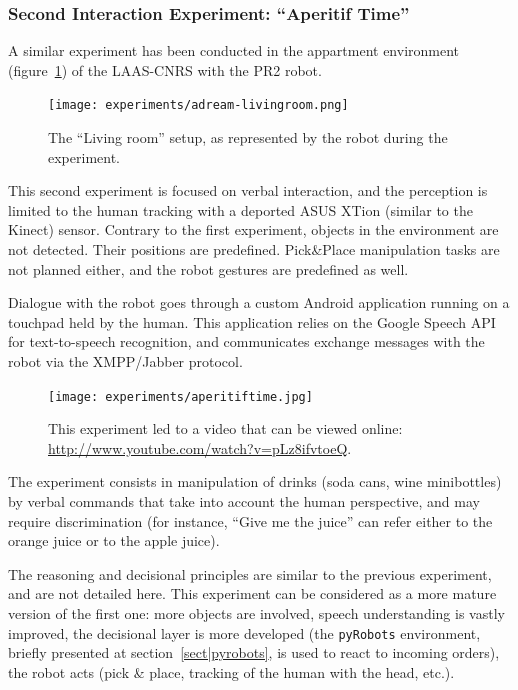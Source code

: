 \subsubsection{Second Interaction Experiment: ``Aperitif Time''}
\label{sect|expe2}

A similar experiment has been conducted in the appartment environment
(figure~\ref{fig|livingroom}) of the LAAS-CNRS with the PR2 robot.

\begin{figure}
    \centering
    \texttt{[image: experiments/adream-livingroom.png]}

    \caption{The ``Living room'' setup, as represented by the robot during the
    experiment.}

    \label{fig|livingroom}
\end{figure}

This second experiment is focused on verbal interaction, and the perception is
limited to the human tracking with a deported ASUS XTion (similar to the
Kinect) sensor. Contrary to the first experiment, objects in the environment
are not detected. Their positions are predefined. Pick\&Place manipulation
tasks are not planned either, and the robot gestures are predefined as well.

Dialogue with the robot goes through a custom Android application running on a
touchpad held by the human. This application relies on the Google Speech API
for text-to-speech recognition, and communicates exchange messages with the
robot via the XMPP/Jabber protocol.


\begin{figure}
    \centering
    \texttt{[image: experiments/aperitiftime.jpg]}
    \caption{This experiment led to a video that can be viewed online:
\url{http://www.youtube.com/watch?v=pLz8ifvtoeQ}.}
    \label{fig|aperitif-video}
\end{figure}

The experiment consists in manipulation of drinks (soda cans, wine minibottles)
by verbal commands that take into account the human perspective, and may
require discrimination (for instance, ``Give me the juice'' can refer either to
the orange juice or to the apple juice).

The reasoning and decisional principles are similar to the previous experiment,
and are not detailed here. This experiment can be considered as a more mature
version of the first one: more objects are involved, speech understanding is
vastly improved, the decisional layer is more developed (the {\tt pyRobots}
environment, briefly presented at section~\ref{sect|pyrobots}, is used to react
to incoming orders), the robot acts (pick \& place, tracking of the human with
the head, etc.).

